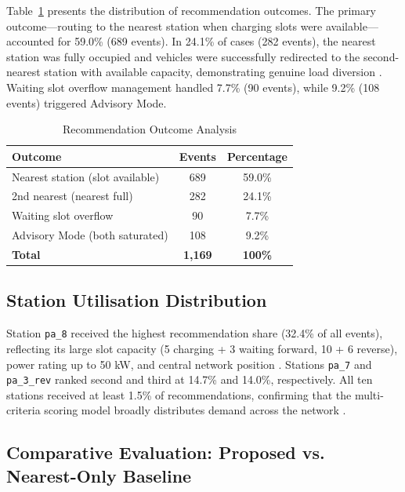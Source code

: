 \documentclass[conference]{IEEEtran}
\begin{document}
Table~\ref{tab:outcomes} presents the distribution of recommendation outcomes. The primary outcome---routing to the nearest station when charging slots were available---accounted for 59.0\% (689 events). In 24.1\% of cases (282 events), the nearest station was fully occupied and vehicles were successfully redirected to the second-nearest station with available capacity, demonstrating genuine load diversion \cite{b7, b17}. Waiting slot overflow management handled 7.7\% (90 events), while 9.2\% (108 events) triggered Advisory Mode.

\begin{table}[htbp]
\caption{Recommendation Outcome Analysis}
\label{tab:outcomes}
\begin{center}
\begin{tabular}{|l|c|c|}
\hline
\textbf{Outcome} & \textbf{Events} & \textbf{Percentage} \\
\hline
Nearest station (slot available)   & 689 & 59.0\% \\
\hline
2nd nearest (nearest full)         & 282 & 24.1\% \\
\hline
Waiting slot overflow              & 90  &  7.7\% \\
\hline
Advisory Mode (both saturated)     & 108 &  9.2\% \\
\hline
\textbf{Total}                     & \textbf{1,169} & \textbf{100\%} \\
\hline
\end{tabular}
\end{center}
\end{table}

\subsection{Station Utilisation Distribution}

Station \texttt{pa\_8} received the highest recommendation share (32.4\% of all events), reflecting its large slot capacity (5 charging + 3 waiting forward, 10 + 6 reverse), power rating up to 50 kW, and central network position \cite{b21}. Stations \texttt{pa\_7} and \texttt{pa\_3\_rev} ranked second and third at 14.7\% and 14.0\%, respectively. All ten stations received at least 1.5\% of recommendations, confirming that the multi-criteria scoring model broadly distributes demand across the network \cite{b5, b6}.

\subsection{Comparative Evaluation: Proposed vs. Nearest-Only Baseline}
\end{document}
